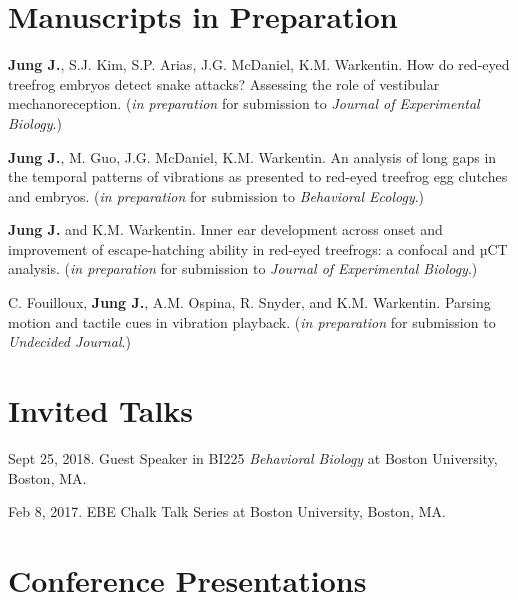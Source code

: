 \documentclass[margin,line]{res}
\begin{document}
\begin{resume}
\section{\sc Manuscripts in Preparation}
{\bf Jung J.}, S.J. Kim, S.P. Arias, J.G. McDaniel, K.M. Warkentin. {How do red-eyed treefrog embryos detect snake attacks? Assessing the role of vestibular mechanoreception.} ({\it in preparation} for submission to {\it Journal of Experimental Biology}.)

\vspace{-.3cm}
{\bf Jung J.}, M. Guo, J.G. McDaniel, K.M. Warkentin. {An analysis of long gaps in the temporal patterns of vibrations as presented to red-eyed treefrog egg clutches and embryos.} ({\it in preparation} for submission to {\it Behavioral Ecology}.)

\vspace{-.3cm}
{\bf Jung J.} and K.M. Warkentin. {Inner ear development across onset and improvement of escape-hatching ability in red-eyed treefrogs: a confocal and µCT analysis.} ({\it in preparation} for submission to {\it Journal of Experimental Biology}.)

\vspace{-.3cm}
C. Fouilloux, {\bf Jung J.}, A.M. Ospina, R. Snyder, and K.M. Warkentin. {Parsing motion and tactile cues in vibration playback.} ({\it in preparation} for submission to {\it Undecided Journal}.)

\section{\sc Invited Talks}

{Sept 25, 2018.} \href{https://drive.google.com/file/d/1y-IedclzU3RPVV73Yw4TzV5FOMYlw-oM/view?usp=sharing}{} {Guest Speaker in BI225} {\it Behavioral Biology} {at Boston University,} {Boston, MA.}

\vspace{-.25cm}
{Feb 8, 2017.} \href{https://drive.google.com/file/d/1KvKo7KuTee1KqaW7tgKxBWrbyrHgGLJz/view?usp=sharing}{} {EBE Chalk Talk Series at Boston University,} {Boston, MA.}

\section{\sc Conference Presentations}


\end{resume}
\end{document}
